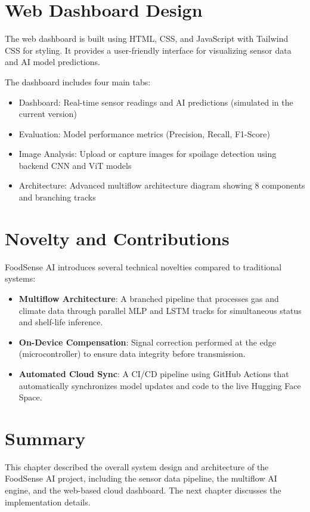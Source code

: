 \section{Web Dashboard Design}
The web dashboard is built using HTML, CSS, and JavaScript with Tailwind CSS for styling. It provides a user-friendly interface for visualizing sensor data and AI model predictions.

The dashboard includes four main tabs:
\begin{itemize}
    \item Dashboard: Real-time sensor readings and AI predictions (simulated in the current version)
    \item Evaluation: Model performance metrics (Precision, Recall, F1-Score)
    \item Image Analysis: Upload or capture images for spoilage detection using backend CNN and ViT models
    \item Architecture: Advanced multiflow architecture diagram showing 8 components and branching tracks
\end{itemize}

\section{Novelty and Contributions}
FoodSense AI introduces several technical novelties compared to traditional systems:
\begin{itemize}
    \item \textbf{Multiflow Architecture}: A branched pipeline that processes gas and climate data through parallel MLP and LSTM tracks for simultaneous status and shelf-life inference.
    \item \textbf{On-Device Compensation}: Signal correction performed at the edge (microcontroller) to ensure data integrity before transmission.
    \item \textbf{Automated Cloud Sync}: A CI/CD pipeline using GitHub Actions that automatically synchronizes model updates and code to the live Hugging Face Space.
\end{itemize}

\section{Summary}
This chapter described the overall system design and architecture of the FoodSense AI project, including the sensor data pipeline, the multiflow AI engine, and the web-based cloud dashboard. The next chapter discusses the implementation details.
